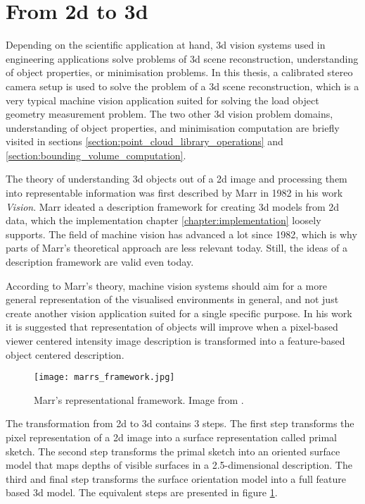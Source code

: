 \documentclass[12pt,a4paper,oneside,pdftex]{report}
\begin{document}
{\section{From 2d to 3d}
\label{section:from_2d_to_3d}

Depending on the scientific application at hand, 3d vision systems used in engineering applications solve problems of 3d scene reconstruction, understanding of object properties, or minimisation problems. In this thesis, a calibrated stereo camera setup is used to solve the problem of a 3d scene reconstruction, which is a very typical machine vision application suited for solving the load object geometry measurement problem. The two other 3d vision problem domains, understanding of object properties, and minimisation computation are briefly visited in sections \ref{section:point_cloud_library_operations} and \ref{section:bounding_volume_computation}. \citep{Sonka07}

The theory of understanding 3d objects out of a 2d image and processing them into representable information was first described by Marr in 1982 in his work \emph{Vision}. Marr ideated a description framework for creating 3d models from 2d data, which the implementation chapter \ref{chapter:implementation} loosely supports. The field of machine vision has advanced a lot since 1982, which is why parts of Marr's theoretical approach are less relevant today. Still, the ideas of a description framework are valid even today.

According to Marr's theory, machine vision systems should aim for a more general representation of the visualised environments in general, and not just create another vision application suited for a single specific purpose. In his work it is suggested that representation of objects will improve when a pixel-based viewer centered intensity image description is transformed into a feature-based object centered description.

\begin{figure}[ht]
  \begin{center}
    \texttt{[image: marrs\_framework.jpg]}
    \caption{Marr's representational framework. Image from \citep{Marr82}.}
    \label{fig:marrs_framework}
  \end{center}
\end{figure}

The transformation from 2d to 3d contains 3 steps. The first step transforms the pixel representation of a 2d image into a surface representation called primal sketch. The second step transforms the primal sketch into an oriented surface model that maps depths of visible surfaces in a 2.5-dimensional description. The third and final step transforms the surface orientation model into a full feature based 3d model. The equivalent steps are presented in figure \ref{fig:marrs_framework}.

}
\end{document}
